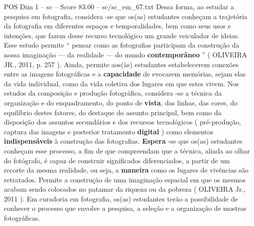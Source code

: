 \begin{textsample}{POS Dim 1 – sc – Score 83.00 – sc/sc\_em\_67.txt}
Dessa forma, ao estudar a pesquisa em fotografia, considera -se que os(as) estudantes conheçam a trajetória da fotografia em diferentes espaços e temporalidades, bem como seus usos e intenções, que fazem desse recurso tecnológico um grande veiculador de ideias.
Esse estudo permite “ pensar como as fotografias participam da construção da nossa imaginação — da realidade — do mundo \textbf{contemporâneo} ” ( OLIVEIRA JR., 2011, p. 257 ).
Ainda, permite aos(às) estudantes estabelecerem conexões entre as imagens fotográficas e a \textbf{capacidade} de evocarem memórias, sejam elas da vida individual, como da vida coletiva dos lugares em que estes vivem.
Nos estudos da composição e produção fotográfica, considera -se a técnica da organização e do enquadramento, do ponto de \textbf{vista}, das linhas, das cores, do equilíbrio destes fatores, do destaque do assunto principal, bem como da disposição dos assuntos secundários e dos recursos tecnológicos ( pré-produção, captura das imagens e posterior tratamento \textbf{digital} ) como elementos \textbf{indispensáveis} à construção das fotografias. \textbf{Espera} -se que os(as) estudantes conheçam esse processo, a fim de que compreendam que a técnica, aliada ao olhar do fotógrafo, é capaz de construir significados diferenciados, a partir de um recorte da mesma realidade, ou seja, a \textbf{maneira} como os lugares de vivências são retratados.
Permite a construção de uma imaginação espacial em que os mesmos acabam sendo colocados no patamar da riqueza ou da pobreza ( OLIVEIRA Jr., 2011 ).
Em curadoria em fotografia, os(as) estudantes terão a possibilidade de conhecer o processo que envolve a pesquisa, a seleção e a organização de mostras fotográficas.

\end{textsample}
